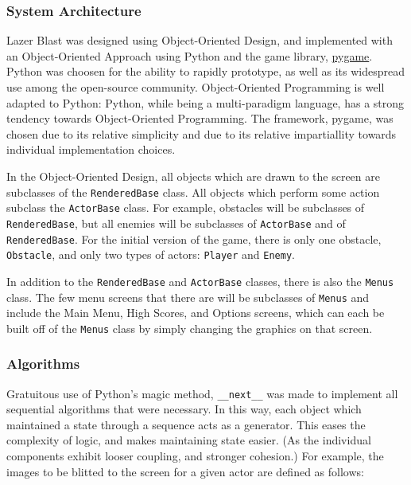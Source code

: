 \subsubsection*{System Architecture}
Lazer Blast was designed using Object-Oriented Design, and implemented
with an Object-Oriented Approach using Python and the game library,
\href{http://pygame.org/news}{pygame}.  Python was choosen for the
ability to rapidly prototype, as well as its widespread use among
the open-source community.  Object-Oriented Programming is well
adapted to Python: Python, while being a multi-paradigm language,
has a strong tendency towards Object-Oriented Programming.  The
framework, pygame, was chosen due to its relative simplicity and due
to its relative impartiallity towards individual implementation choices.

In the Object-Oriented Design, all objects which are drawn to the screen
are subclasses of the \texttt{RenderedBase} class.  All
objects which perform some action subclass the \texttt{ActorBase}
class.  For example, obstacles will be subclasses of
\texttt{RenderedBase}, but all enemies will be subclasses of
\texttt{ActorBase} and of \texttt{RenderedBase}.
For the initial version of the game, there is only one obstacle,
\texttt{Obstacle}, and only two types of actors:
\texttt{Player} and \texttt{Enemy}.


In addition to the \texttt{RenderedBase} and
\texttt{ActorBase} classes, there is also the
\texttt{Menus} class. The few menu screens that there are
will be subclasses of \texttt{Menus} and include the Main
Menu, High Scores, and Options screens, which can each be built off of
the \texttt{Menus} class by simply changing the graphics
on that screen.

\subsubsection*{Algorithms}

Gratuitous use of Python's magic method, \texttt{__next__}
was made to implement all sequential algorithms that were necessary.
In this way, each object which maintained a state through a sequence
acts as a generator.  This eases the complexity of logic, and makes
maintaining state easier. (As the individual components exhibit looser
coupling, and stronger cohesion.)  For example, the images to be blitted
to the screen for a given actor are defined as follows:

